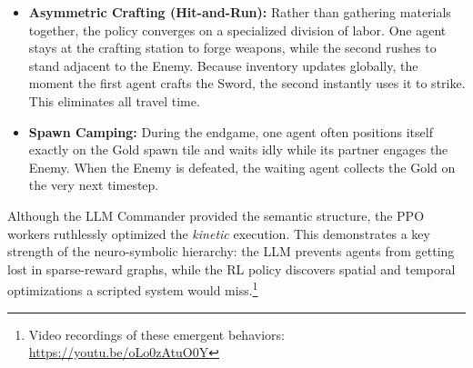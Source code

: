 \begin{itemize}
    \item \textbf{Asymmetric Crafting (Hit-and-Run):} Rather than gathering materials together, the policy converges on a specialized division of labor. One agent stays at the crafting station to forge weapons, while the second rushes to stand adjacent to the Enemy. Because inventory updates globally, the moment the first agent crafts the Sword, the second instantly uses it to strike. This eliminates all travel time.
    \item \textbf{Spawn Camping:} During the endgame, one agent often positions itself exactly on the Gold spawn tile and waits idly while its partner engages the Enemy. When the Enemy is defeated, the waiting agent collects the Gold on the very next timestep.
\end{itemize}

Although the LLM Commander provided the semantic structure, the PPO workers ruthlessly optimized the \emph{kinetic} execution. This demonstrates a key strength of the neuro-symbolic hierarchy: the LLM prevents agents from getting lost in sparse-reward graphs, while the RL policy discovers spatial and temporal optimizations a scripted system would miss.\footnote{Video recordings of these emergent behaviors: \url{https://youtu.be/oLo0zAtuO0Y}}
